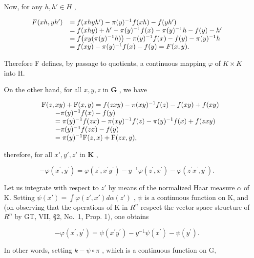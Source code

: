 Now, for any \(h, h' \in H\) ,

\[
\begin{array}{r l} F (x h, y h ^ {\prime}) & = f (x h y h ^ {\prime}) - \pi (y) ^ {- 1} f (x h) - f (y h ^ {\prime}) \\ & = f (x h y) + h ^ {\prime} - \pi (y) ^ {- 1} f (x) - \pi (y) ^ {- 1} h - f (y) - h ^ {\prime} \\ & = f \big (x y (\pi (y) ^ {- 1} h) \big) - \pi (y) ^ {- 1} f (x) - f (y) - \pi (y) ^ {- 1} h \\ & = f (x y) - \pi (y) ^ {- 1} f (x) - f (y) = F (x, y). \end{array}
\]

Therefore F defines, by passage to quotients, a continuous mapping \(\varphi\) of \(K \times K\) into H.

On the other hand, for all \(x, y, z\) in \(\mathbf{G}\) , we have

\[
\begin{array}{r l} & {\mathrm{F} (z, x y) + \mathrm{F} (x, y) = f (z x y) - \pi (x y) ^ {- 1} f (z) - f (x y) + f (x y)} \\ & {\qquad - \pi (y) ^ {- 1} f (x) - f (y)} \\ & {\qquad = \pi (y) ^ {- 1} f (z x) - \pi (x y) ^ {- 1} f (z) - \pi (y) ^ {- 1} f (x) + f (z x y)} \\ & {\qquad - \pi (y) ^ {- 1} f (z x) - f (y)} \\ & {\qquad = \pi (y) ^ {- 1} \mathrm{F} (z, x) + \mathrm{F} (z x, y),} \end{array}
\]

therefore, for all \(x', y', z'\) in \(\mathbf{K}\) ,

\[
- \varphi (x ^ {\prime}, y ^ {\prime}) = \varphi (z ^ {\prime}, x ^ {\prime} y ^ {\prime}) - y ^ {- 1} \varphi (z ^ {\prime}, x ^ {\prime}) - \varphi (z ^ {\prime} x ^ {\prime}, y ^ {\prime}).
\]

Let us integrate with respect to \(z'\) by means of the normalized Haar measure \(\alpha\) of K. Setting \(\psi(x') = \int \varphi(z', x') d\alpha(z')\) , \(\psi\) is a continuous function on K, and (on observing that the operations of K in \(R^{n}\) respect the vector space structure of \(R^{n}\) by GT, VII, §2, No.~1, Prop. 1), one obtains

\[
- \varphi (x ^ {\prime}, y ^ {\prime}) = \psi (x ^ {\prime} y ^ {\prime}) - y ^ {- 1} \psi (x ^ {\prime}) - \psi (y ^ {\prime}).
\]

In other words, setting \(k - \psi \circ \pi\) , which is a continuous function on G,

